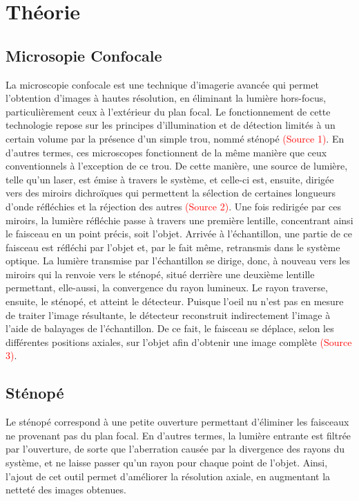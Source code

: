 \documentclass[11pt,letterpaper]{article}
\begin{document}
\section{Théorie}
\subsection{Microsopie Confocale}
La microscopie confocale est une technique d'imagerie avancée qui permet l'obtention d'images à hautes résolution, en éliminant la lumière hors-focus, particulièrement ceux à l'extérieur du plan focal. Le fonctionnement de cette technologie repose sur les principes d'illumination et de détection limités à un certain volume par la présence d'un simple trou, nommé sténopé \textcolor{red}{(Source 1)}. En d'autres termes, ces microscopes fonctionnent de la même manière que ceux conventionnels à l'exception de ce trou. De cette manière, une source de lumière, telle qu'un laser, est émise à travers le système, et celle-ci est, ensuite, dirigée vers des miroirs dichroïques qui permettent la sélection de certaines longueurs d'onde réfléchies et la réjection des autres \textcolor{red}{(Source 2)}. Une fois redirigée par ces miroirs, la lumière réfléchie passe à travers une première lentille, concentrant ainsi le faisceau en un point précis, soit l'objet. Arrivée à l'échantillon, une partie de ce faisceau est réfléchi par l'objet et, par le fait même, retransmis dans le système optique. La lumière transmise par l'échantillon se dirige, donc, à nouveau vers les miroirs qui la renvoie vers le sténopé, situé derrière une deuxième lentille permettant, elle-aussi, la convergence du rayon lumineux. Le rayon traverse, ensuite, le sténopé, et atteint le détecteur. Puisque l'oeil nu n'est pas en mesure de traiter l'image résultante, le détecteur reconstruit indirectement l'image à l'aide de balayages de l'échantillon. De ce fait, le faisceau se déplace, selon les différentes positions axiales, sur l'objet afin d'obtenir une image complète \textcolor{red}{(Source 3)}.


\subsection{Sténopé}
Le sténopé correspond à une petite ouverture permettant d'éliminer les faisceaux ne provenant pas du plan focal. En d'autres termes, la lumière entrante est filtrée par l'ouverture, de sorte que l'aberration causée par la divergence des rayons du système, et ne laisse passer qu'un rayon pour chaque point de l'objet. Ainsi, l'ajout de cet outil permet d'améliorer la résolution axiale, en augmentant la netteté des images obtenues.
\end{document}

